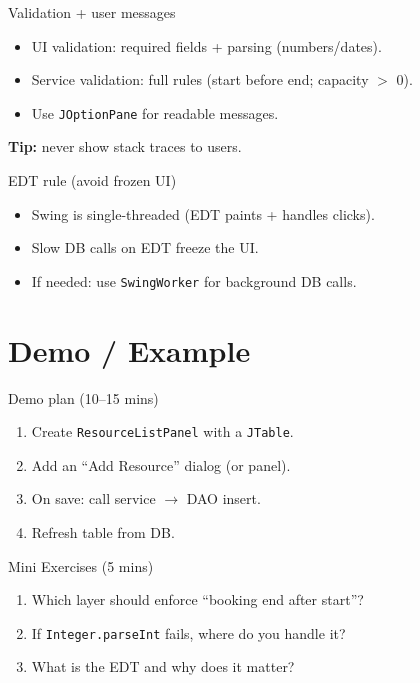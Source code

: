 \documentclass{beamer}
\begin{document}
\begin{frame}{Validation + user messages}
  \begin{itemize}[<+->]
    \item UI validation: required fields + parsing (numbers/dates).
    \item Service validation: full rules (start before end; capacity $>$ 0).
    \item Use \texttt{JOptionPane} for readable messages.
  \end{itemize}
  \textbf{Tip:} never show stack traces to users.
  \slidesources{\OOPSUnitVISources}
\end{frame}

\begin{frame}{EDT rule (avoid frozen UI)}
  \begin{itemize}[<+->]
    \item Swing is single-threaded (EDT paints + handles clicks).
    \item Slow DB calls on EDT freeze the UI.
    \item If needed: use \texttt{SwingWorker} for background DB calls.
  \end{itemize}
  \slidesources{\OOPSUnitVISources}
\end{frame}

\section{Demo / Example}
\label{sec:demo}

\begin{frame}{Demo plan (10--15 mins)}
  \begin{enumerate}[<+->]
    \item Create \texttt{ResourceListPanel} with a \texttt{JTable}.
    \item Add an ``Add Resource'' dialog (or panel).
    \item On save: call service $\rightarrow$ DAO insert.
    \item Refresh table from DB.
  \end{enumerate}
  \slidesources{\OOPSUnitVISources}
\end{frame}

\begin{frame}{Mini Exercises (5 mins)}
  \begin{enumerate}[<+->]
    \item Which layer should enforce ``booking end after start''?
    \item If \texttt{Integer.parseInt} fails, where do you handle it?
    \item What is the EDT and why does it matter?
  \end{enumerate}
  \slidesources{\OOPSUnitVISources}
\end{frame}
\end{document}

